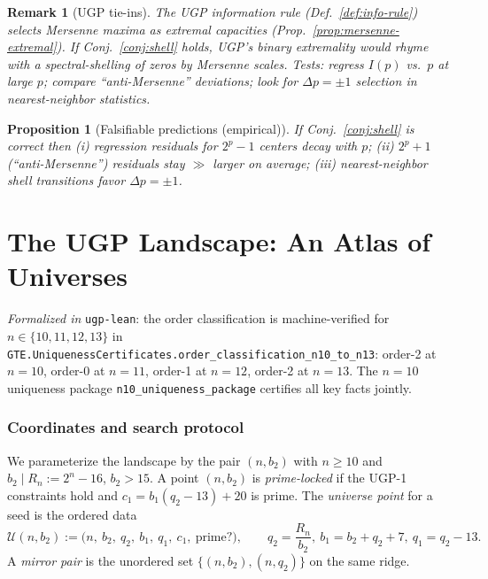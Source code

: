 \documentclass[12pt]{article}
\newtheorem{proposition}[theorem]{Proposition}
\newtheorem{remark}[theorem]{Remark}
\numberwithin{equation}{section}
\begin{document}
\begin{remark}[UGP tie-ins]\label{rem:zeta-ugp}
The UGP information rule (Def.~\ref{def:info-rule}) selects Mersenne maxima as extremal capacities (Prop.~\ref{prop:mersenne-extremal}). If Conj.~\ref{conj:shell} holds, UGP's binary extremality would rhyme with a spectral-shelling of zeros by Mersenne scales. Tests: regress $I(p)$ vs.\ $p$ at large $p$; compare ``anti-Mersenne'' deviations; look for $\Delta p=\pm1$ selection in nearest-neighbor statistics.
\end{remark}

\begin{proposition}[Falsifiable predictions (empirical)]\label{prop:zeta-preds}
If Conj.~\ref{conj:shell} is correct then (i) regression residuals for $2^p-1$ centers decay with $p$; (ii) $2^p+1$ (``anti-Mersenne'') residuals stay $\gg$ larger on average; (iii) nearest-neighbor shell transitions favor $\Delta p=\pm1$.
\end{proposition}


\section{The UGP Landscape: An Atlas of Universes}\label{sec:atlas}

\noindent\emph{Formalized in} \texttt{ugp-lean}: the order classification is machine-verified for $n\in\{10,11,12,13\}$ in \texttt{GTE.UniquenessCertificates.order\_classification\_n10\_to\_n13}: order-2 at $n=10$, order-0 at $n=11$, order-1 at $n=12$, order-2 at $n=13$. The $n=10$ uniqueness package \texttt{n10\_uniqueness\_package} certifies all key facts jointly.

\subsubsection{Coordinates and search protocol}
We parameterize the landscape by the pair $(n,b_2)$ with $n\ge 10$ and $b_2\mid R_n:=2^n-16$, $b_2>15$. A point $(n,b_2)$ is \emph{prime-locked} if the UGP-1 constraints hold and $c_1=b_1(q_2-13)+20$ is prime. The \emph{universe point} for a seed is the ordered data
\[
\mathcal{U}(n,b_2):=\big(n,\ b_2,\ q_2,\ b_1,\ q_1,\ c_1,\ \text{prime?}\big),\qquad q_2=\frac{R_n}{b_2},\ b_1=b_2+q_2+7,\ q_1=q_2-13.
\]
A \emph{mirror pair} is the unordered set $\{(n,b_2),(n,q_2)\}$ on the same ridge.
\end{document}
